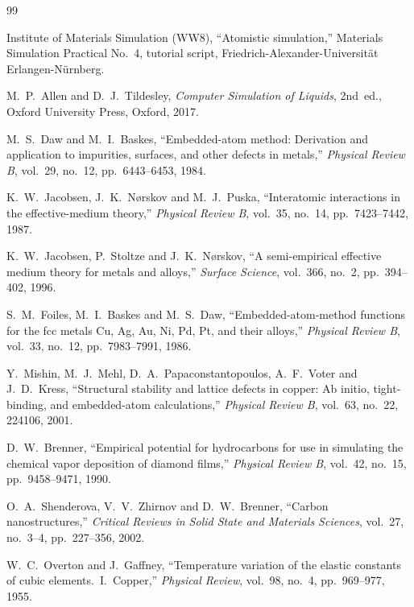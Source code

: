 \documentclass[11pt,a4paper]{article}
\numberwithin{equation}{section}
\theoremstyle{remark}
\begin{document}
\begin{thebibliography}{99}

Institute of Materials Simulation (WW8),
``Atomistic simulation,''
Materials Simulation Practical No.~4, tutorial script,
Friedrich-Alexander-Universit\"at Erlangen-N\"urnberg.

M.~P.~Allen and D.~J.~Tildesley,
\textit{Computer Simulation of Liquids},
2nd~ed.,
Oxford University Press, Oxford, 2017.

M.~S.~Daw and M.~I.~Baskes,
``Embedded-atom method: Derivation and application to impurities, surfaces, and other defects in
metals,''
\textit{Physical Review B},
vol.~29, no.~12, pp.~6443--6453, 1984.

K.~W.~Jacobsen, J.~K.~N{\o}rskov and M.~J.~Puska,
``Interatomic interactions in the effective-medium theory,''
\textit{Physical Review B},
vol.~35, no.~14, pp.~7423--7442, 1987.

K.~W.~Jacobsen, P.~Stoltze and J.~K.~N{\o}rskov,
``A semi-empirical effective medium theory for metals and alloys,''
\textit{Surface Science},
vol.~366, no.~2, pp.~394--402, 1996.

S.~M.~Foiles, M.~I.~Baskes and M.~S.~Daw,
``Embedded-atom-method functions for the fcc metals Cu, Ag, Au, Ni, Pd, Pt, and their alloys,''
\textit{Physical Review B},
vol.~33, no.~12, pp.~7983--7991, 1986.

Y.~Mishin, M.~J.~Mehl, D.~A.~Papaconstantopoulos, A.~F.~Voter and J.~D.~Kress,
``Structural stability and lattice defects in copper: Ab initio, tight-binding, and embedded-atom
calculations,''
\textit{Physical Review B},
vol.~63, no.~22, 224106, 2001.

D.~W.~Brenner,
``Empirical potential for hydrocarbons for use in simulating the chemical vapor deposition of diamond
films,''
\textit{Physical Review B},
vol.~42, no.~15, pp.~9458--9471, 1990.

O.~A.~Shenderova, V.~V.~Zhirnov and D.~W.~Brenner,
``Carbon nanostructures,''
\textit{Critical Reviews in Solid State and Materials Sciences},
vol.~27, no.~3--4, pp.~227--356, 2002.

W.~C.~Overton and J.~Gaffney,
``Temperature variation of the elastic constants of cubic elements.~I.~Copper,''
\textit{Physical Review},
vol.~98, no.~4, pp.~969--977, 1955.


\end{thebibliography}
\end{document}
